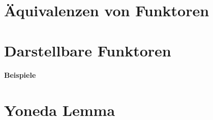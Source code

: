 \documentclass{article}
\begin{document}
\section{Äquivalenzen von Funktoren}

\section{Darstellbare Funktoren}

\paragraph{Beispiele}

\section{Yoneda Lemma}
\end{document}
